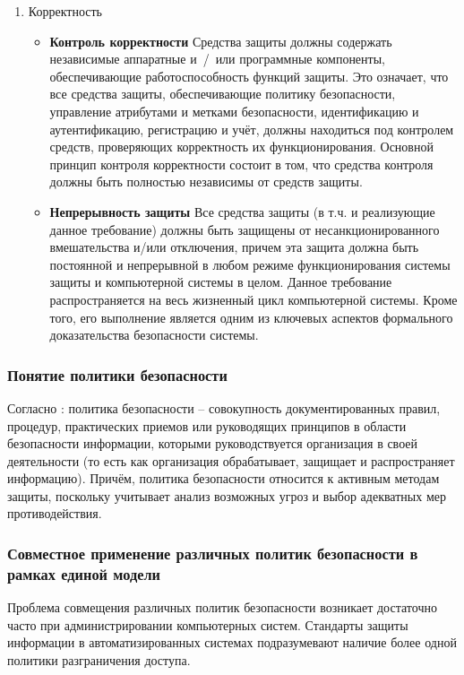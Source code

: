 \begin{enumerate}
	\item Корректность
	\begin{itemize}
		\item \textbf{Контроль корректности} Средства защиты должны содержать независимые аппаратные и~/~или программные компоненты, обеспечивающие работоспособность функций защиты. Это означает, что все средства защиты, обеспечивающие политику безопасности, управление атрибутами и метками безопасности, идентификацию и аутентификацию, регистрацию и учёт, должны находиться под контролем средств, проверяющих корректность их функционирования. Основной принцип контроля корректности состоит в том, что средства контроля должны быть полностью независимы от средств защиты.
		\item \textbf{Непрерывность защиты} Все средства защиты (в т.ч. и реализующие данное требование) должны быть защищены от несанкционированного вмешательства и/или отключения, причем эта защита должна быть постоянной и непрерывной в любом режиме функционирования системы защиты и компьютерной системы в целом. Данное требование распространяется на весь жизненный цикл компьютерной системы. Кроме того, его выполнение является одним из ключевых аспектов формального доказательства безопасности системы.
	\end{itemize}
\end{enumerate}

\subsubsection{Понятие политики безопасности}
Согласно \cite{GOST50922}: политика безопасности -- совокупность документированных
правил, процедур, практических приемов или руководящих принципов в области безопасности
информации, которыми руководствуется организация в своей деятельности (то есть как организация
обрабатывает, защищает и распространяет информацию). Причём, политика безопасности относится
к активным методам защиты, поскольку учитывает анализ возможных угроз и выбор адекватных мер
противодействия.

\subsubsection{Совместное применение различных политик безопасности в рамках единой модели}
Проблема совмещения различных политик безопасности возникает достаточно часто при администрировании компьютерных систем. Стандарты защиты информации в автоматизированных системах подразумевают наличие более одной политики разграничения доступа.

